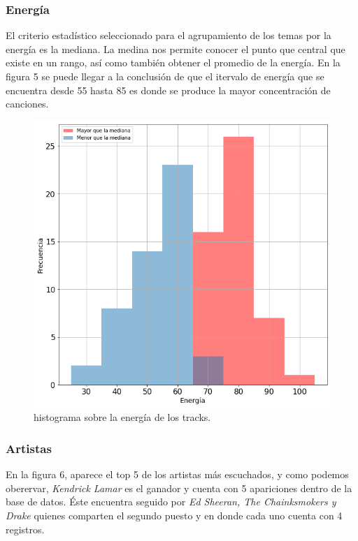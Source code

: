 \documentclass{article}
\begin{document}
\newpage
\subsubsection{Energía}
El criterio estadístico seleccionado para el agrupamiento de los temas por la
energía es la mediana. La medina nos permite conocer el punto que central que
existe en un rango, así como también obtener el promedio de la energía. En la
figura 5 se puede llegar a la conclusión de que el itervalo de energía que se
encuentra desde 55 hasta 85 es donde se produce la mayor concentración de
canciones.

\begin{figure}[h]
  \centering
  \includegraphics[scale=0.5]{e}
  \caption{histograma sobre la energía de los tracks.}
\end{figure}

\newpage
\subsubsection{Artistas}
En la figura 6, aparece el top 5 de los artistas más escuchados, y como podemos
oberervar, \textit{Kendrick Lamar} es el ganador y cuenta con 5 apariciones
dentro de la base de datos. Éste encuentra seguido por
\textit{Ed Sheeran, The Chainksmokers y Drake} quienes comparten el segundo
puesto y en donde cada uno cuenta con 4 registros.
\end{document}
